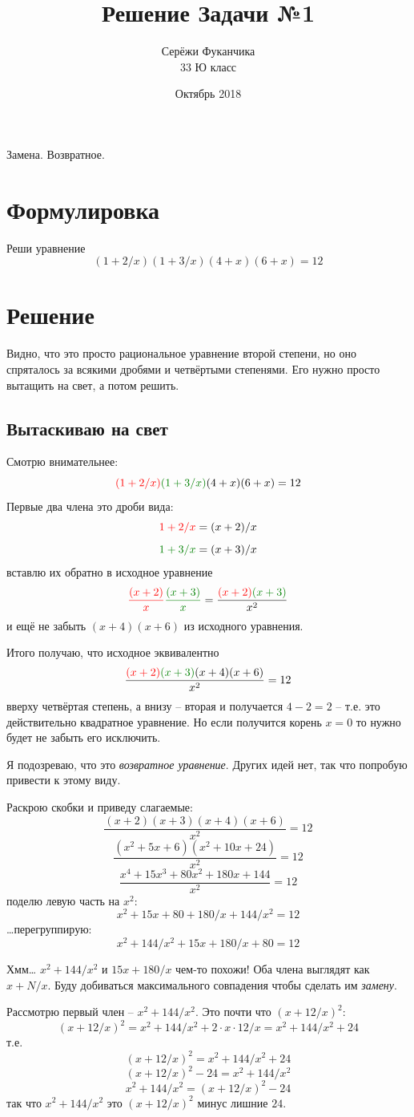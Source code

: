 \documentclass{article}
\title{Решение Задачи №1}
\author{Серёжи Фуканчика\\33 Ю класс}
\date{Октябрь 2018}
\begin{document}
\maketitle
Замена. Возвратное.
\section{Формулировка}
Реши уравнение
$$(1+2/x)(1+3/x)(4+x)(6+x)=12$$

\section{Решение}
Видно, что это просто рациональное уравнение второй степени, но оно спряталось за всякими дробями и четвёртыми степенями. Его нужно просто вытащить на свет, а потом решить.

\subsection{Вытаскиваю на свет}
Смотрю внимательнее:
$${\color{red}(1+2/x)}{\color{mygreen}(1+3/x)}(4+x)(6+x)=12$$
Первые два члена это дроби вида:
$${\color{red}1+2/x} = (x+2)/x$$
$${\color{mygreen}1+3/x} = (x+3)/x$$
вставлю их обратно в исходное уравнение
$${\color{red}\frac{(x+2)}{x}}{\color{mygreen}\frac{(x+3)}{x}}=\frac{{\color{red}(x+2)}{\color{mygreen}(x+3)}}{x^2}$$
и ещё не забыть $(x+4)(x+6)$ из исходного уравнения.

Итого получаю, что исходное эквивалентно
$$\frac{{\color{red}(x+2)}{\color{mygreen}(x+3)}(x+4)(x+6)}{x^2}=12$$
вверху четвёртая степень, а внизу -- вторая и получается $4-2=2$ -- т.е. это действительно квадратное уравнение.
Но если получится корень $x=0$ то нужно будет не забыть его исключить.

Я подозреваю, что это \textit{возвратное уравнение}. Других идей нет, так что попробую привести к этому виду.

\begin{samepage}
Раскрою скобки и приведу слагаемые:
$$\frac{(x+2)(x+3)(x+4)(x+6)}{x^2}=12$$
$$\frac{(x^2+5x+6)(x^2+10x+24)}{x^2}=12$$
$$ \frac{x^4+15x^3+80x^2+180x+144}{x^2}=12 $$
поделю левую часть на $x^2$:
$$ x^2+15x+80+180/x+144/x^2=12 $$
\ldots{}перегруппирую:
$$ x^2+144/x^2+15x+180/x+80=12 $$
\end{samepage}
Хмм\ldots{} ${x^2+144/x^2}$ и ${15x+180/x}$ чем-то похожи! Оба члена выглядят как ${x+N/x}$. Буду добиваться максимального совпадения чтобы сделать им \textit{замену}.

\begin{samepage}
Рассмотрю первый член -- ${x^2+144/x^2}$. Это почти что ${(x+12/x)^2}$:
$$(x+12/x)^2=x^2+144/x^2+2 \cdot x \cdot 12/x=x^2+144/x^2+24 $$
т.е.
$$(x+12/x)^2=x^2+144/x^2+24$$
$$(x+12/x)^2-24=x^2+144/x^2$$
$$x^2+144/x^2=(x+12/x)^2-24$$
так что $ x^2+144/x^2$ это $(x+12/x)^2$ минус лишние $24$.
\end{samepage}
\end{document}
